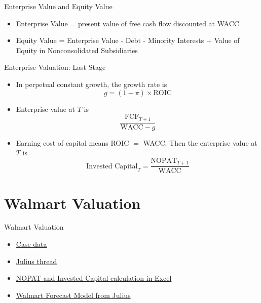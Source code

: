 \documentclass[10pt]{beamer}
\begin{document}
  \begin{frame}{Enterprise Value and Equity Value}
    \begin{itemize}
        \item Enterprise Value = present value of free cash flow discounted at WACC
        \item Equity Value = Enterprise Value - Debt - Minority Interests + Value of Equity in Nonconsolidated Subsidiaries
    \end{itemize}
    \end{frame}

    \begin{frame}{Enterprise Valuation: Last Stage}
        \begin{itemize}
         \item In perpetual constant growth, the growth rate is 
         $$g = (1-\pi) \times \text{ROIC}$$
         \item Enterprise value at $T$ is 
         $$\frac{\text{FCF}_{T+1}}{\text{WACC} - g}$$
        \item Earning cost of capital means ROIC $=$ WACC. Then the enterprise value at $T$ is 
        $$\text{Invested Capital}_T = \frac{\text{NOPAT}_{T+1}}{\text{WACC}}$$
        \end{itemize}
\end{frame}

\section{Walmart Valuation}

\begin{frame}{Walmart Valuation}
    \begin{itemize}
    \item \href{https://mgmt675-2025.kerryback.comassets/Walmart.xlsx}{Case data}
    \item \href{https://julius.ai/s/1eb08d2f-4f6e-4d5a-8787-5228da1d22bd}{Julius thread}
    \item \href{https://mgmt675-2025.kerryback.comassets/Walmart_NOPAT_IC.xlsx}{NOPAT and Invested Capital calculation in Excel}
    \item \href{https://mgmt675-2025.kerryback.comassets/Walmart_Forecast_Model.xlsx}{Walmart Forecast Model from Julius}
    \end{itemize}
\end{frame}
\end{document}
